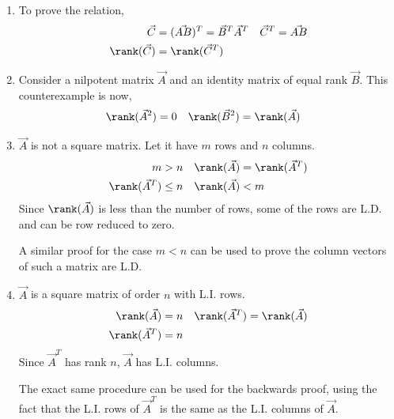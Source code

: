 \begin{enumerate}
    \item To prove the relation,
          \begin{align}
              \vec{C}        & = (\vec{AB})^T = \vec{B}^T\vec{A}^T &
              \vec{C}^T      & = \vec{AB}                            \\
              \rank(\vec{C}) & = \rank(\vec{C}^T)
          \end{align}

    \item Consider a nilpotent matrix $ \vec{A} $ and an identity matrix of equal
          rank $ \vec{B} $. This counterexample is now,
          \begin{align}
              \rank(\vec{A}^2) & = 0              &
              \rank(\vec{B}^2) & = \rank(\vec{A})
          \end{align}

    \item $\vec{A}$ is not a square matrix. Let it have $ m $ rows and $ n $ columns.
          \begin{align}
              m                & > n    & \rank(\vec{A}) & = \rank(\vec{A}^T) \\
              \rank(\vec{A}^T) & \leq n & \rank(\vec{A}) & < m
          \end{align}
          Since $ \rank(\vec{A}) $ is less than the number of rows, some of the rows are
          L.D. and can be row reduced to zero. \par
          A similar proof for the case $ m < n $ can be used to prove the column vectors
          of such a matrix are L.D.

    \item $\vec{A}$ is a square matrix of order $ n $ with L.I. rows.
          \begin{align}
              \rank(\vec{A})   & = n & \rank(\vec{A}^T) & = \rank(\vec{A}) \\
              \rank(\vec{A}^T) & = n
          \end{align}
          Since $ \vec{A}^T $ has rank $ n $, $ \vec{A} $ has L.I. columns. \par
          The exact same procedure can be used for the backwards proof, using the fact
          that the L.I. rows of $ \vec{A}^T $ is the same as the L.I. columns of
          $ \vec{A} $.


\end{enumerate}
